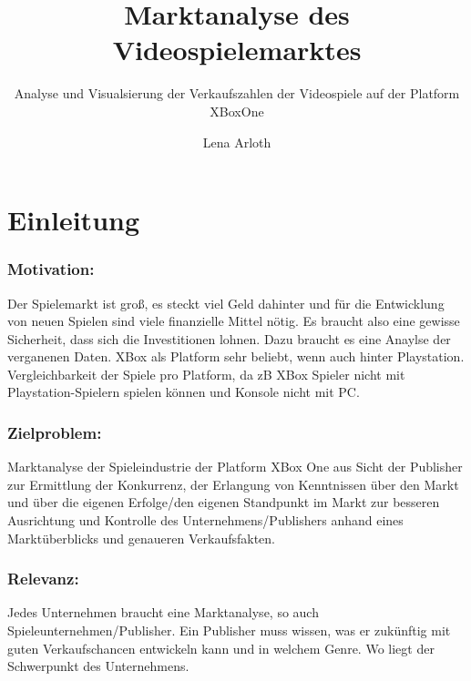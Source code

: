 \documentclass[usegeometry=true]{scrartcl}
\begin{document}
\subject{Projektbericht zum Modul Information Retrieval und Visualisierung Sommersemester 2022}
\title{Marktanalyse des Videospielemarktes}
\subtitle{Analyse und Visualsierung der Verkaufszahlen der Videospiele auf der Platform XBoxOne}
\author{Lena Arloth}%
\maketitle%

\section{Einleitung}
\subsubsection {Motivation:} Der Spielemarkt ist groß, es steckt viel Geld dahinter und für die Entwicklung von neuen Spielen sind viele finanzielle Mittel nötig. Es braucht also eine gewisse Sicherheit, dass sich die Investitionen lohnen. Dazu braucht es eine Anaylse der verganenen Daten. XBox als Platform sehr beliebt, wenn auch hinter Playstation. Vergleichbarkeit der Spiele pro Platform, da zB XBox Spieler nicht mit Playstation-Spielern spielen können und Konsole nicht mit PC.
\subsubsection {Zielproblem:} Marktanalyse der Spieleindustrie der Platform XBox One aus Sicht der Publisher zur Ermittlung der Konkurrenz, der Erlangung von Kenntnissen über den Markt und über die eigenen Erfolge/den eigenen Standpunkt im Markt zur besseren Ausrichtung und Kontrolle des Unternehmens/Publishers anhand eines Marktüberblicks und genaueren Verkaufsfakten.
\subsubsection {Relevanz:} Jedes Unternehmen braucht eine Marktanalyse, so auch Spieleunternehmen/Publisher. Ein Publisher muss wissen, was er zukünftig mit guten Verkaufschancen entwickeln kann und in welchem Genre. Wo liegt der Schwerpunkt des Unternehmens.
\end{document}
